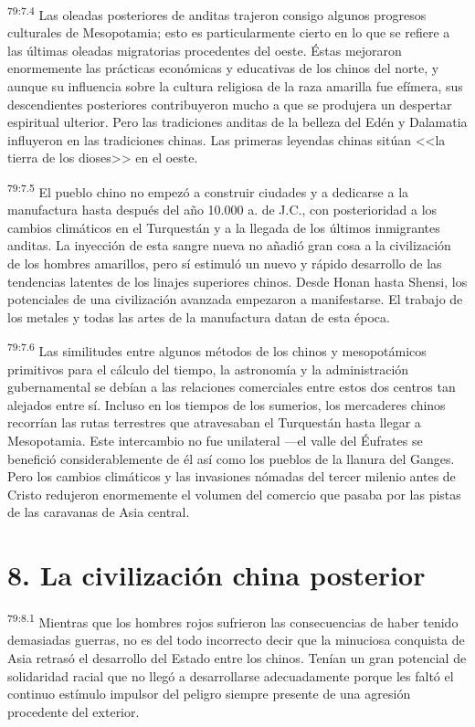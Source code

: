 \par
\textsuperscript{79:7.4} Las oleadas posteriores de anditas trajeron consigo algunos progresos culturales de Mesopotamia; esto es particularmente cierto en lo que se refiere a las últimas oleadas migratorias procedentes del oeste. Éstas mejoraron enormemente las prácticas económicas y educativas de los chinos del norte, y aunque su influencia sobre la cultura religiosa de la raza amarilla fue efímera, sus descendientes posteriores contribuyeron mucho a que se produjera un despertar espiritual ulterior. Pero las tradiciones anditas de la belleza del Edén y Dalamatia influyeron en las tradiciones chinas. Las primeras leyendas chinas sitúan <<la tierra de los dioses>> en el oeste.

\par
\textsuperscript{79:7.5} El pueblo chino no empezó a construir ciudades y a dedicarse a la manufactura hasta después del año 10.000 a. de J.C., con posterioridad a los cambios climáticos en el Turquestán y a la llegada de los últimos inmigrantes anditas. La inyección de esta sangre nueva no añadió gran cosa a la civilización de los hombres amarillos, pero sí estimuló un nuevo y rápido desarrollo de las tendencias latentes de los linajes superiores chinos. Desde Honan hasta Shensi, los potenciales de una civilización avanzada empezaron a manifestarse. El trabajo de los metales y todas las artes de la manufactura datan de esta época.

\par
\textsuperscript{79:7.6} Las similitudes entre algunos métodos de los chinos y mesopotámicos primitivos para el cálculo del tiempo, la astronomía y la administración gubernamental se debían a las relaciones comerciales entre estos dos centros tan alejados entre sí. Incluso en los tiempos de los sumerios, los mercaderes chinos recorrían las rutas terrestres que atravesaban el Turquestán hasta llegar a Mesopotamia. Este intercambio no fue unilateral ---el valle del Éufrates se benefició considerablemente de él así como los pueblos de la llanura del Ganges. Pero los cambios climáticos y las invasiones nómadas del tercer milenio antes de Cristo redujeron enormemente el volumen del comercio que pasaba por las pistas de las caravanas de Asia central.

\section*{8. La civilización china posterior}
\par
\textsuperscript{79:8.1} Mientras que los hombres rojos sufrieron las consecuencias de haber tenido demasiadas guerras, no es del todo incorrecto decir que la minuciosa conquista de Asia retrasó el desarrollo del Estado entre los chinos. Tenían un gran potencial de solidaridad racial que no llegó a desarrollarse adecuadamente porque les faltó el continuo estímulo impulsor del peligro siempre presente de una agresión procedente del exterior.

